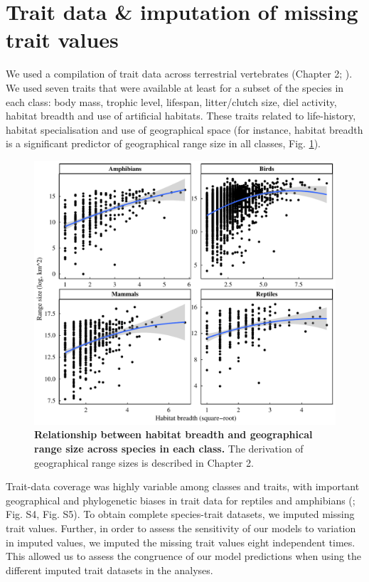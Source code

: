 \pagebreak
\clearpage

\section{Trait data \& imputation of missing trait values}

We used a compilation of trait data across terrestrial vertebrates (Chapter 2; \citet{Etard2020}). We used seven traits that were available at least for a subset of the species in each class: body mass, trophic level, lifespan, litter/clutch size, diel activity, habitat breadth and use of artificial habitats. These traits related to life-history, habitat specialisation and use of geographical space (for instance, habitat breadth is a significant predictor of geographical range size in all classes, Fig. \ref{}). 

\begin{figure}[h!]
\centering
\includegraphics[scale=0.6]{Supporting/Chapter3/Figures/SI_Rangesize_HB}
\caption[Relationship between habitat breadth and geographical range size across species in each class]{\textbf{Relationship between habitat breadth and geographical range size across species in each class.} The derivation of geographical range sizes is described in Chapter 2.}
\label{}
\end{figure}

Trait-data coverage was highly variable among classes and traits, with important geographical and phylogenetic biases in trait data for reptiles and amphibians (\cite{Etard2020}; Fig. S4, Fig. S5). To obtain complete species-trait datasets, we imputed missing trait values. Further, in order to assess the sensitivity of our models to variation in imputed values, we imputed the missing trait values eight independent times. This allowed us to assess the congruence of our model predictions when using the different imputed trait datasets in the analyses. 

